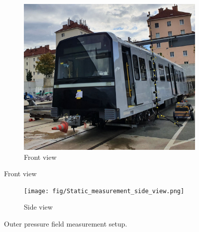 \begin{figure}[H]
     \centering
     \begin{subfigure}[b]{0.7\textwidth}
         \centering
         \includegraphics[width=\linewidth]{fig/Static_measurement_front_view.jpg}
         \caption{Front view}
         \label{fig:ubxfrontview}
     \end{subfigure}
\end{figure}

\begin{figure}[H]\ContinuedFloat
    \centering
    \begin{subfigure}[b]{\textwidth}
         \centering
         \texttt{[image: fig/Static\_measurement\_side\_view.png]}
         \caption{Side view}
         \label{fig:ubxsideview}
     \end{subfigure}
     \caption{Outer pressure field measurement setup.}
     \label{fig:outersetup}
\end{figure}


